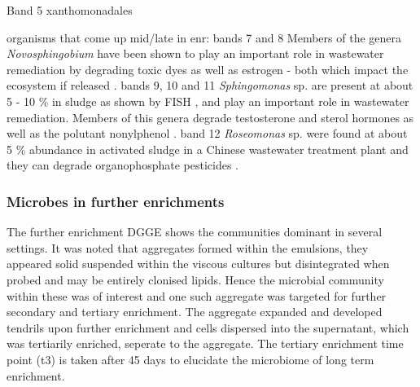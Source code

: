 \documentclass[11pt]{article}
\begin{document}
Band 5 xanthomonadales

organisms that come up mid/late in enr:
bands 7 and 8 Members of the genera \emph{Novosphingobium} have been shown to play an important role in wastewater remediation by degrading toxic dyes as well as estrogen - both which impact the ecosystem if released \cite{addison2007novosphingobium,hashimoto2009contribution}.
bands 9, 10 and 11 \emph{Sphingomonas} sp. are present at about 5 - 10 \% in sludge as shown by FISH \cite{neef1999detection}, and play an important role in wastewater remediation. Members of this genera degrade testosterone and sterol hormones as well as the polutant nonylphenol \cite{fujii2001sphingomonas,roh201017beta}.
band 12 \emph{Roseomonas} sp. were found at about 5 \% abundance in activated sludge in a Chinese wastewater treatment plant and they can degrade organophosphate pesticides \cite{jiang2008bacterial,jiang2006isolation}.

\subsubsection{Microbes in further enrichments}
The further enrichment DGGE shows the communities dominant in several settings. It was noted that aggregates formed within the emulsions, they appeared solid suspended within the viscous cultures but disintegrated when probed and may be entirely clonised lipids. Hence the microbial community within these was of interest and one such aggregate was targeted for further secondary and tertiary enrichment. The aggregate expanded and developed tendrils upon further enrichment and    cells dispersed into the supernatant, which was tertiarily enriched, seperate to the aggregate. The tertiary enrichment time point (t3) is taken after 45 days to elucidate the microbiome of long term enrichment.
\end{document}
